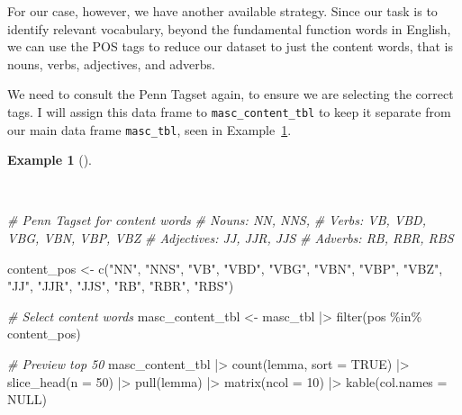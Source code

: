 \documentclass[
  letterpaper,
  DIV=11,
  numbers=noendperiod]{scrreprt}
\newenvironment{Shaded}{\begin{snugshade}}{\end{snugshade}}
\newcommand{\AttributeTok}[1]{\textcolor[rgb]{0.00,0.00,0.00}{#1}}
\newcommand{\CommentTok}[1]{\textcolor[rgb]{0.00,0.00,0.00}{\textit{#1}}}
\newcommand{\ConstantTok}[1]{\textcolor[rgb]{0.00,0.00,0.00}{#1}}
\newcommand{\DecValTok}[1]{\textcolor[rgb]{0.00,0.00,0.00}{#1}}
\newcommand{\FunctionTok}[1]{\textcolor[rgb]{0.00,0.00,0.00}{#1}}
\newcommand{\NormalTok}[1]{\textcolor[rgb]{0.00,0.00,0.00}{#1}}
\newcommand{\OtherTok}[1]{\textcolor[rgb]{0.00,0.00,0.00}{#1}}
\newcommand{\SpecialCharTok}[1]{\textcolor[rgb]{0.00,0.00,0.00}{#1}}
\newcommand{\StringTok}[1]{\textcolor[rgb]{0.00,0.00,0.00}{#1}}
\theoremstyle{definition}
\newtheorem{example}{Example}[chapter]
\theoremstyle{remark}
\begin{document}
For our case, however, we have another available strategy. Since our
task is to identify relevant vocabulary, beyond the fundamental function
words in English, we can use the POS tags to reduce our dataset to just
the content words, that is nouns, verbs, adjectives, and adverbs.

We need to consult the Penn Tagset again, to ensure we are selecting the
correct tags. I will assign this data frame to
\texttt{masc\_content\_tbl} to keep it separate from our main data frame
\texttt{masc\_tbl}, seen in Example~\ref{exm-eda-masc-filter-pos}.

\begin{example}[]\protect\hypertarget{exm-eda-masc-filter-pos}{}\label{exm-eda-masc-filter-pos}

~

\begin{Shaded}
\begin{Highlighting}[]
\CommentTok{\# Penn Tagset for content words}
\CommentTok{\# Nouns: NN, NNS,}
\CommentTok{\# Verbs: VB, VBD, VBG, VBN, VBP, VBZ}
\CommentTok{\# Adjectives: JJ, JJR, JJS}
\CommentTok{\# Adverbs: RB, RBR, RBS}

\NormalTok{content\_pos }\OtherTok{\textless{}{-}} \FunctionTok{c}\NormalTok{(}\StringTok{"NN"}\NormalTok{, }\StringTok{"NNS"}\NormalTok{, }\StringTok{"VB"}\NormalTok{, }\StringTok{"VBD"}\NormalTok{, }\StringTok{"VBG"}\NormalTok{, }\StringTok{"VBN"}\NormalTok{, }\StringTok{"VBP"}\NormalTok{, }\StringTok{"VBZ"}\NormalTok{, }\StringTok{"JJ"}\NormalTok{, }\StringTok{"JJR"}\NormalTok{, }\StringTok{"JJS"}\NormalTok{, }\StringTok{"RB"}\NormalTok{, }\StringTok{"RBR"}\NormalTok{, }\StringTok{"RBS"}\NormalTok{)}

\CommentTok{\# Select content words}
\NormalTok{masc\_content\_tbl }\OtherTok{\textless{}{-}}
\NormalTok{  masc\_tbl }\SpecialCharTok{|\textgreater{}}
  \FunctionTok{filter}\NormalTok{(pos }\SpecialCharTok{\%in\%}\NormalTok{ content\_pos)}

\CommentTok{\# Preview top 50}
\NormalTok{masc\_content\_tbl }\SpecialCharTok{|\textgreater{}}
  \FunctionTok{count}\NormalTok{(lemma, }\AttributeTok{sort =} \ConstantTok{TRUE}\NormalTok{) }\SpecialCharTok{|\textgreater{}}
  \FunctionTok{slice\_head}\NormalTok{(}\AttributeTok{n =} \DecValTok{50}\NormalTok{) }\SpecialCharTok{|\textgreater{}}
  \FunctionTok{pull}\NormalTok{(lemma) }\SpecialCharTok{|\textgreater{}}
  \FunctionTok{matrix}\NormalTok{(}\AttributeTok{ncol =} \DecValTok{10}\NormalTok{) }\SpecialCharTok{|\textgreater{}}
  \FunctionTok{kable}\NormalTok{(}\AttributeTok{col.names =} \ConstantTok{NULL}\NormalTok{)}
\end{Highlighting}
\end{Shaded}


\end{example}
\end{document}
